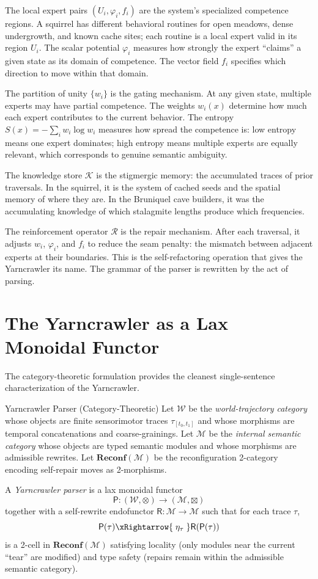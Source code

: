 The local expert pairs $(U_i, \varphi_i, f_i)$ are the system's specialized competence
regions. A squirrel has different behavioral routines for open meadows, dense undergrowth,
and known cache sites; each routine is a local expert valid in its region $U_i$. The
scalar potential $\varphi_i$ measures how strongly the expert ``claims'' a given state
as its domain of competence. The vector field $f_i$ specifies which direction to move
within that domain.

The partition of unity $\{w_i\}$ is the gating mechanism. At any given state, multiple
experts may have partial competence. The weights $w_i(x)$ determine how much each
expert contributes to the current behavior. The entropy $S(x) = -\sum_i w_i \log w_i$
measures how spread the competence is: low entropy means one expert dominates; high
entropy means multiple experts are equally relevant, which corresponds to genuine
semantic ambiguity.

The knowledge store $\mathcal{K}$ is the stigmergic memory: the accumulated traces of
prior traversals. In the squirrel, it is the system of cached seeds and the spatial
memory of where they are. In the Bruniquel cave builders, it was the accumulating
knowledge of which stalagmite lengths produce which frequencies.

The reinforcement operator $\mathcal{R}$ is the repair mechanism. After each traversal,
it adjusts $w_i$, $\varphi_i$, and $f_i$ to reduce the seam penalty: the mismatch
between adjacent experts at their boundaries. This is the self-refactoring operation
that gives the Yarncrawler its name. The grammar of the parser is rewritten by the
act of parsing.

\section{The Yarncrawler as a Lax Monoidal Functor}

The category-theoretic formulation provides the cleanest single-sentence characterization
of the Yarncrawler.

\begin{definition}{Yarncrawler Parser (Category-Theoretic)}
Let $\mathcal{W}$ be the \emph{world-trajectory category} whose objects are finite
sensorimotor traces $\tau_{[t_0,t_1]}$ and whose morphisms are temporal
concatenations and coarse-grainings. Let $\mathcal{M}$ be the \emph{internal
semantic category} whose objects are typed semantic modules and whose morphisms are
admissible rewrites. Let $\mathbf{Reconf}(\mathcal{M})$ be the reconfiguration
2-category encoding self-repair moves as 2-morphisms.

A \emph{Yarncrawler parser} is a lax monoidal functor
\[
  \mathsf{P}: (\mathcal{W}, \otimes) \longrightarrow (\mathcal{M}, \boxtimes)
\]
together with a self-rewrite endofunctor
$\mathsf{R}: \mathcal{M} \to \mathcal{M}$ such that for each trace $\tau$,
\[
  \mathsf{P}(\tau) \xRightarrow{\;\eta_\tau\;} \mathsf{R}(\mathsf{P}(\tau))
\]
is a 2-cell in $\mathbf{Reconf}(\mathcal{M})$ satisfying locality (only modules
near the current ``tear'' are modified) and type safety (repairs remain within
the admissible semantic category).
\end{definition}

